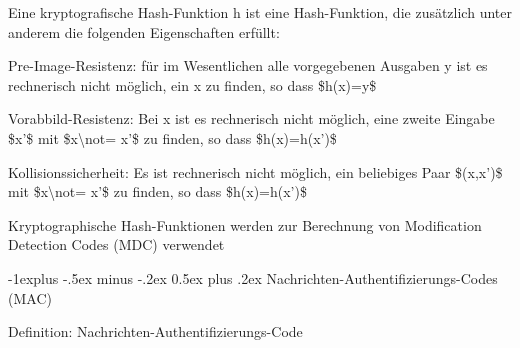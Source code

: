 \documentclass[a4paper]{article}
\makeatletter
\renewcommand{\subsection}{\@startsection{subsection}{2}{0mm}%
 {-1explus -.5ex minus -.2ex}%
 {0.5ex plus .2ex}%
 {\normalfont\normalsize\bfseries}}
\makeatother
\begin{document}
\begin{multicols}{3}
\begin{itemize*}
            \begin{itemize*}
                  \item Eine kryptografische Hash-Funktion h ist eine Hash-Funktion, die zusätzlich unter anderem die folgenden Eigenschaften erfüllt:
                  \begin{itemize*} \item Pre-Image-Resistenz: für im Wesentlichen alle vorgegebenen Ausgaben y ist es rechnerisch nicht möglich, ein x zu finden, so dass \$h(x)=y\$ \item \begin{enumerate*} \def\labelenumi{\arabic{enumi}.} \setcounter{enumi}{1} \item Vorabbild-Resistenz: Bei x ist es rechnerisch nicht möglich, eine zweite Eingabe \$x'\$ mit \$x\textbackslash not= x'\$ zu finden, so dass \$h(x)=h(x')\$ \end{enumerate*} \item Kollisionssicherheit: Es ist rechnerisch nicht möglich, ein beliebiges Paar \$(x,x')\$ mit \$x\textbackslash not= x'\$ zu finden, so dass \$h(x)=h(x')\$ \end{itemize*}
                  \item Kryptographische Hash-Funktionen werden zur Berechnung von Modification Detection Codes (MDC) verwendet
            \end{itemize*}
      \end{itemize*}


      \subsection{Nachrichten-Authentifizierungs-Codes
            (MAC)}

      \begin{itemize*}
            \item
            Definition: Nachrichten-Authentifizierungs-Code


\end{itemize*}
\end{multicols}
\end{document}
